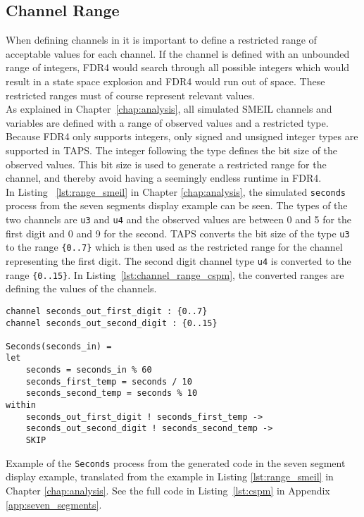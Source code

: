 \subsection{\cspm{} Channel Range}
When defining channels in \cspm{} it is important to define a restricted range of acceptable values for each channel. If the channel is defined with an unbounded range of integers, FDR4 would search through all possible integers which would result in a state space explosion and FDR4 would run out of space. These restricted ranges must of course represent relevant values.\\

As explained in Chapter~\ref{chap:analysis}, all simulated SMEIL channels and variables are defined with a range of observed values and a restricted type.
Because FDR4 only supports integers, only signed and unsigned integer types are supported in TAPS. The integer following the type defines the bit size of the observed values. This bit size is used to generate a restricted range for the \cspm{} channel, and thereby avoid having a seemingly endless runtime in FDR4.\\

In Listing ~\ref{lst:range_smeil} in Chapter \ref{chap:analysis}, the simulated \texttt{seconds} process from the seven segments display example can be seen. The types of the two channels are \texttt{u3} and \texttt{u4} and the observed values are between 0 and 5 for the first digit and 0 and 9 for the second. TAPS converts the bit size of the type \texttt{u3} to the range \texttt{\{0..7\}} which is then used as the restricted range for the \cspm{} channel representing the first digit. The second digit channel type \texttt{u4} is converted to the range \texttt{\{0..15\}}. In Listing~\ref{lst:channel_range_cspm}, the converted ranges are defining the values of the \cspm{} channels.\\

\begin{listing}
\begin{verbatim}
channel seconds_out_first_digit : {0..7}
channel seconds_out_second_digit : {0..15}

Seconds(seconds_in) =
let
    seconds = seconds_in % 60
    seconds_first_temp = seconds / 10
    seconds_second_temp = seconds % 10
within
    seconds_out_first_digit ! seconds_first_temp ->
    seconds_out_second_digit ! seconds_second_temp ->
    SKIP
\end{verbatim}
\caption{Example of the \texttt{Seconds} process from the generated \cspm{} code in the seven segment display example, translated from the example in Listing \ref{lst:range_smeil} in Chapter \ref{chap:analysis}. See the full code in Listing~\ref{lst:cspm} in Appendix \ref{app:seven_segments}.}
\label{lst:channel_range_cspm}
\end{listing}

